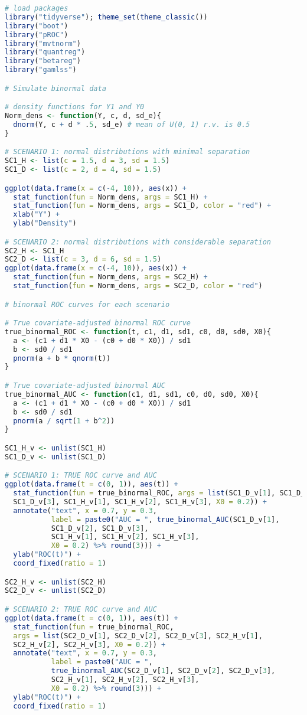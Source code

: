 \documentclass{article}
\begin{document}
\begin{lstlisting}[language=R]
# load packages
library("tidyverse"); theme_set(theme_classic())
library("boot")
library("pROC")
library("mvtnorm")
library("quantreg")
library("betareg")
library("gamlss")

# Simulate binormal data

# density functions for Y1 and Y0
Norm_dens <- function(Y, c, d, sd_e){
  dnorm(Y, c + d * .5, sd_e) # mean of U(0, 1) r.v. is 0.5
}

# SCENARIO 1: normal distributions with minimal separation
SC1_H <- list(c = 1.5, d = 3, sd = 1.5)
SC1_D <- list(c = 2, d = 4, sd = 1.5)

ggplot(data.frame(x = c(-4, 10)), aes(x)) +
  stat_function(fun = Norm_dens, args = SC1_H) +
  stat_function(fun = Norm_dens, args = SC1_D, color = "red") +
  xlab("Y") + 
  ylab("Density")

# SCENARIO 2: normal distributions with considerable separation
SC2_H <- SC1_H
SC2_D <- list(c = 3, d = 6, sd = 1.5)
ggplot(data.frame(x = c(-4, 10)), aes(x)) +
  stat_function(fun = Norm_dens, args = SC2_H) +
  stat_function(fun = Norm_dens, args = SC2_D, color = "red")

# binormal ROC curves for each scenario

# True covariate-adjusted binormal ROC curve
true_binormal_ROC <- function(t, c1, d1, sd1, c0, d0, sd0, X0){
  a <- (c1 + d1 * X0 - (c0 + d0 * X0)) / sd1
  b <- sd0 / sd1
  pnorm(a + b * qnorm(t))
}

# True covariate-adjusted binormal AUC
true_binormal_AUC <- function(c1, d1, sd1, c0, d0, sd0, X0){
  a <- (c1 + d1 * X0 - (c0 + d0 * X0)) / sd1
  b <- sd0 / sd1
  pnorm(a / sqrt(1 + b^2))
}

SC1_H_v <- unlist(SC1_H)
SC1_D_v <- unlist(SC1_D)

# SCENARIO 1: TRUE ROC curve and AUC
ggplot(data.frame(t = c(0, 1)), aes(t)) +
  stat_function(fun = true_binormal_ROC, args = list(SC1_D_v[1], SC1_D_v[2],
  SC1_D_v[3], SC1_H_v[1], SC1_H_v[2], SC1_H_v[3], X0 = 0.2)) +
  annotate("text", x = 0.7, y = 0.3, 
           label = paste0("AUC = ", true_binormal_AUC(SC1_D_v[1],
           SC1_D_v[2], SC1_D_v[3],
           SC1_H_v[1], SC1_H_v[2], SC1_H_v[3],
           X0 = 0.2) %>% round(3))) +
  ylab("ROC(t)") +
  coord_fixed(ratio = 1)

SC2_H_v <- unlist(SC2_H)
SC2_D_v <- unlist(SC2_D)

# SCENARIO 2: TRUE ROC curve and AUC
ggplot(data.frame(t = c(0, 1)), aes(t)) +
  stat_function(fun = true_binormal_ROC, 
  args = list(SC2_D_v[1], SC2_D_v[2], SC2_D_v[3], SC2_H_v[1], 
  SC2_H_v[2], SC2_H_v[3], X0 = 0.2)) +
  annotate("text", x = 0.7, y = 0.3, 
           label = paste0("AUC = ",
           true_binormal_AUC(SC2_D_v[1], SC2_D_v[2], SC2_D_v[3],
           SC2_H_v[1], SC2_H_v[2], SC2_H_v[3],
           X0 = 0.2) %>% round(3))) +
  ylab("ROC(t)") +
  coord_fixed(ratio = 1)


\end{lstlisting}
\end{document}
